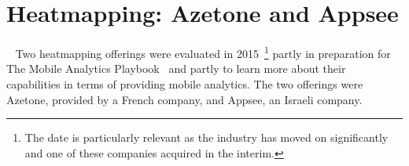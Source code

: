 \section{Heatmapping: Azetone and Appsee}~\label{section-heatmapping}
Two heatmapping offerings were evaluated in 2015~\footnote{The date is particularly relevant as the industry has moved on significantly and one of these companies acquired in the interim.} partly in preparation for The Mobile Analytics Playbook~\citep{harty_aymer_playbook_2016} and partly to learn more about their capabilities in terms of providing mobile analytics. The two offerings were Azetone, provided by a French company, and Appsee, an Israeli company. %

